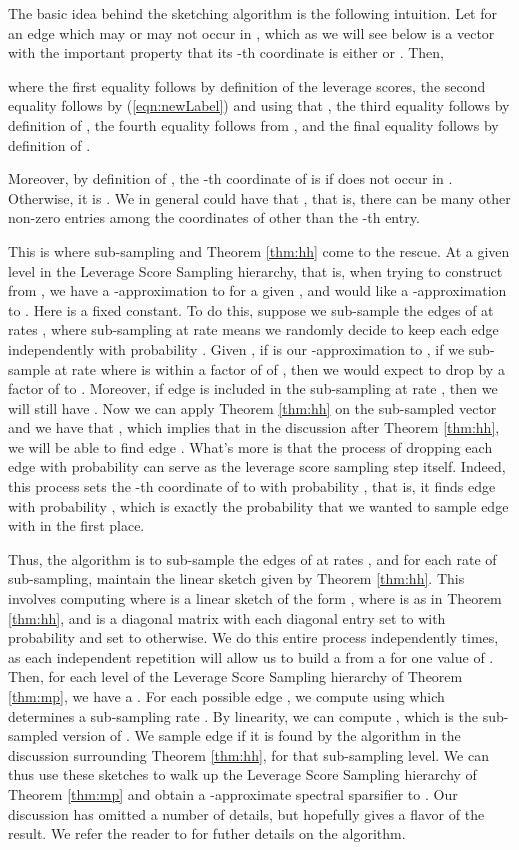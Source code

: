 \documentclass[11pt]{article}
\begin{document}
The basic idea behind the sketching algorithm is the following intuition. 
Let  for an edge  which may or may not occur in , which as we will
see below is a vector with the important property that its -th coordinate is either  or . Then, 

where the first equality follows by definition of the leverage scores, the second equality 
follows by (\ref{eqn:newLabel}) and using that , the third equality
follows by definition of , the fourth equality follows from , and 
the final equality follows by definition of . 

Moreover, by definition of , the -th coordinate of  is  if  does not occur in . 
Otherwise, it is . 
We in general could have that , that is, there can be many other
non-zero entries among the coordinates of  other than the -th entry.

This is where sub-sampling and Theorem \ref{thm:hh} come to the rescue. 
At a given level in the Leverage Score Sampling hierarchy, that is, when trying to construct  from
, we have a -approximation
 to  for a given , and would like a -approximation to . Here
 is a fixed constant. To do this,
suppose we sub-sample the edges of  at rates , where sub-sampling
at rate  means we randomly decide to keep each edge independently with probability . Given ,
if  is our -approximation to , if we sub-sample at rate  where
 is within a factor of  of , then we would expect  to drop by a factor
of  to . Moreover, if edge  is included in the sub-sampling at rate ,
then we will still have . Now we can apply Theorem \ref{thm:hh} on the sub-sampled vector 
and we have that , which implies that in the discussion after 
Theorem \ref{thm:hh}, we will be able to find edge . 
What's more is that the process of dropping each edge with probability 
can serve as the leverage score sampling step itself. Indeed, this process sets the -th coordinate of 
to  with probability , that is, it finds edge  with probability , which
is exactly the probability that we wanted to sample edge  with in the first place. 

Thus, the algorithm is to sub-sample the edges of  at rates , and for each rate
of sub-sampling, maintain the linear sketch given by Theorem \ref{thm:hh}. This involves computing 
where  is a linear sketch of the form , where  is as in Theorem \ref{thm:hh},
and  is a diagonal matrix with each diagonal entry set to  with probability  and set to  otherwise.
We do this entire process independently
 times, as each independent repetition will allow us to build a  from a  for one
value of . 
Then, for each level of the Leverage Score Sampling hierarchy of Theorem \ref{thm:mp}, we
have a . For each possible edge , we compute  using  which determines
a sub-sampling rate . By linearity, we can compute , which is the
sub-sampled version of . We sample edge  
if it is found by the algorithm  in the discussion surrounding Theorem \ref{thm:hh}, for that sub-sampling level. We 
can thus use these sketches to walk up the Leverage Score Sampling hierarchy of Theorem \ref{thm:mp} and 
obtain a -approximate spectral sparsifier to . 
Our discussion has omitted a number of details, but hopefully gives a flavor of the result. 
We refer the reader to \cite{KLMMS14} for futher details
on the algorithm. 
\end{document}
